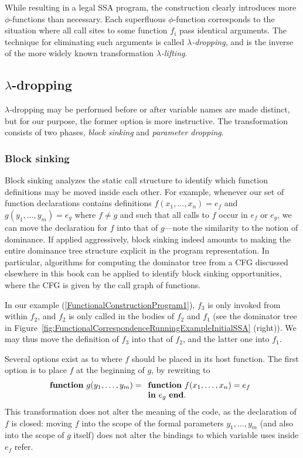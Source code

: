 {While resulting in a legal SSA program, the construction clearly
introduces more $\phi$-functions than necessary. Each superfluous
$\phi$-function corresponds to the situation where all call sites to
some function $f_i$ pass identical arguments. The technique for
eliminating such arguments is called
\emph{$\lambda$-dropping}, and is
the inverse of the more widely known transformation
\emph{$\lambda$-lifting}. 

\subsection{$\lambda$-dropping}
\label{section:Part1:Semantics:lambdaDropping}

$\lambda$-dropping 
may be performed before or after variable names are
made distinct, but for our purpose, the former option is more
instructive.  The transformation consists of two phases, \emph{block
sinking} and \emph{parameter dropping}.

\subsubsection{Block sinking}
\label{section:Part1:Semantics:lambdaDropping:blockSinking}
Block sinking analyzes the static call structure to 
identify which
function definitions may be moved inside each other. For example,
whenever our set of function declarations contains definitions $f
(x_1,\ldots,x_n) = e_f$ and $ g (y_1,\ldots,y_m) = e_g$ where $f \neq
g$ and such that all calls to $f$ occur in $e_f$ or $e_g$, we can move the
declaration for $f$ into that of $g$---note the similarity to the
notion of dominance. If applied aggressively, block sinking indeed
amounts to making the entire dominance tree structure explicit in the
program representation. In particular, algorithms for computing the
dominator tree from a CFG discussed elsewhere in this book can be
applied to identify block sinking opportunities, where the CFG is
given by the call graph of functions.

In our example (\ref{FunctionalConstructionProgram1}), $f_3$ is only invoked 
from within $f_2$, and $f_2$ is
only called in the bodies of $f_2$ and $f_1$ (see the dominator tree
in Figure~\ref{fig:FunctionalCorrespondenceRunningExampleInitialSSA}
(right)).  We may thus move the definition of $f_3$ into that of
$f_2$, and the latter one into $f_1$.

Several options exist as to where $f$ should be placed in its host
function. The first option is to place $f$ at the beginning of $g$,
by rewriting to 
$$\mathtt{function}\ g(y_1,\ldots,y_m) =
\begin{array}[t]{l} 
  \mathtt{function}\ f(x_1,\ldots,x_n) = e_f\\
  \mathtt{in}\ e_g\ \mathtt{end}.
\end{array}
$$ This transformation does not alter the meaning of the code, as the
declaration of $f$ is closed: moving $f$ into the scope of the
formal parameters $y_1,\ldots,y_m$ (and also into the scope of $g$
itself) does not alter the bindings to which variable uses inside
$e_f$ refer.

}
